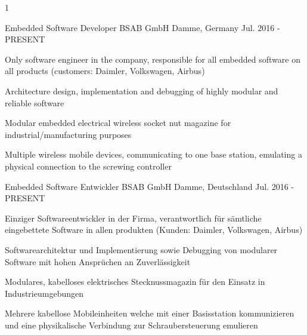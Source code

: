 \begin{cventries}
\multilang
  {1}
  {\cventry
    {Embedded Software Developer} %
    {BSAB GmbH} %
    {Damme, Germany} %
    {Jul. 2016 - PRESENT} %
    {
      \begin{cvitems} %
        \item {Only software engineer in the company, responsible for all embedded software on all products (customers: Daimler, Volkswagen, Airbus)}
        \item {Architecture design, implementation and debugging of highly modular and reliable software}
        \item {Modular embedded electrical wireless socket nut magazine for industrial/manufacturing purposes}
        \item {Multiple wireless mobile devices, communicating to one base station, emulating a physical connection to the screwing controller}
      \end{cvitems}
    }
  }{\cventry
    {Embedded Software Entwickler} %
    {BSAB GmbH} %
    {Damme, Deutschland} %
    {Jul. 2016 - PRESENT} %
    {
      \begin{cvitems} %
        \item {Einziger Softwareentwickler in der Firma, verantwortlich für sämtliche eingebettete Software in allen produkten (Kunden: Daimler, Volkswagen, Airbus)}
        \item {Softwarearchitektur und Implementierung sowie Debugging von modularer Software mit hohen Ansprüchen an Zuverlässigkeit}
        \item {Modulares, kabelloses elektrisches Stecknussmagazin für den Einsatz in Industrieumgebungen}
        \item {Mehrere kabellose Mobileinheiten welche mit einer Basisstation kommunizieren und eine physikalische Verbindung zur Schraubersteuerung emulieren}
      \end{cvitems}
    }
  }


\end{cventries}
